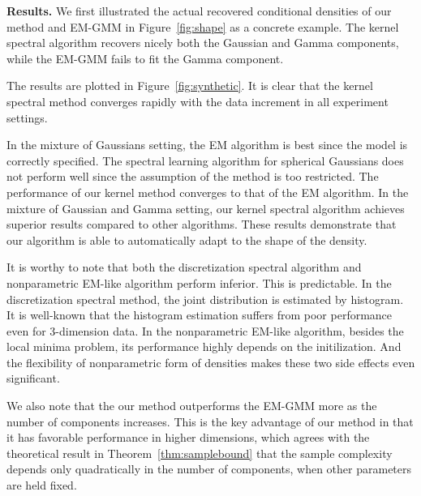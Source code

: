 \documentclass{article}
\begin{document}
{\bf Results.} We first illustrated the actual recovered conditional densities of our method and EM-GMM in Figure~\ref{fig:shape} as a concrete example. The kernel spectral algorithm recovers nicely both the Gaussian and Gamma components, while the EM-GMM fails to fit the Gamma component.

The results are plotted in Figure~\ref{fig:synthetic}. It is clear that the kernel spectral method converges rapidly with the data increment in all experiment settings.

In the mixture of Gaussians setting, the EM algorithm is best since the model is correctly specified. The spectral learning algorithm for spherical Gaussians does not perform well since the assumption of the method is too restricted. The performance of our kernel method converges to that of the EM algorithm. In the mixture of Gaussian and Gamma setting, our kernel spectral algorithm achieves superior results compared to other algorithms. These results demonstrate that our algorithm is able to automatically adapt to the shape of the density.

It is worthy to note that both the discretization spectral algorithm and nonparametric EM-like algorithm perform inferior. This is predictable. In the discretization spectral method, the joint distribution is estimated by histogram. It is well-known that the histogram estimation suffers from poor performance even for $3$-dimension data. In the nonparametric EM-like algorithm, besides the local minima problem, its performance highly depends on the initilization. And the flexibility of nonparametric form of densities makes these two side effects even significant.

We also note that the our method outperforms the EM-GMM more as the number of components increases.
This is the key advantage of our method in that it has favorable performance in higher dimensions, which agrees with the theoretical result in Theorem~\ref{thm:samplebound} that the sample complexity depends only quadratically in the number of components, when other parameters are held fixed.
\end{document}
